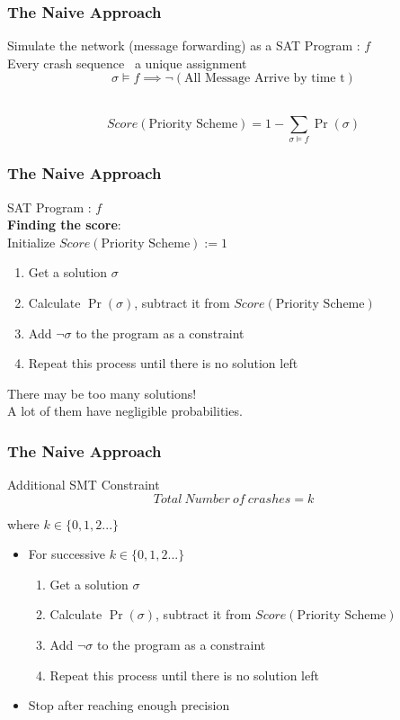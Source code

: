 \documentclass{beamer}
\begin{document}
\begin{frame}
\frametitle{The Naive Approach}
	Simulate the network (message forwarding) as a SAT Program : $ f $ \\[3ex]
	Every crash sequence \mapsto\ a unique assignment \sigma\  
	\vspace*{-5pt}
	$$ \sigma \vDash f \implies \neg(\text{All Message Arrive by time t}) $$
	\begin{block}{$\ $}
	$$ Score(\text{Priority Scheme}) = 1-\sum_{\sigma \vDash f}\Pr(\sigma) $$
	\end{block}
\end{frame}

\begin{frame}
\frametitle{The Naive Approach}
	
	SAT Program : $ f $ \\[3ex]
	\textbf{Finding the score}:\\
	Initialize $Score(\text{Priority Scheme}):=1$

	\begin{enumerate}
		\item Get a solution $\sigma$
		\item Calculate $\Pr(\sigma)$, subtract it from $Score(\text{Priority Scheme})$
		\item Add $\neg \sigma$ to the program as a constraint
		\item Repeat this process until there is no solution left\\[3ex]
	\end{enumerate}
	\pause
	\color{red}
	There may be too many solutions!\\
	A lot of them have negligible probabilities.\\
\end{frame}

\begin{frame}
\frametitle{The Naive Approach}
	\begin{block}{Additional SMT Constraint}
	\begin{equation}
		Total\ Number\ of\ crashes = k
	\end{equation} 
	\begin{flushright}
		where $k\in\{0,1,2...\}$
	\end{flushright}
	\end{block}
	\pause
	\begin{itemize}
	\item For successive $k\in\{0,1,2...\}$
	\begin{enumerate}
		\item Get a solution $\sigma$
		\item Calculate $\Pr(\sigma)$, subtract it from $Score(\text{Priority Scheme})$
		\item Add $\neg \sigma$ to the program as a constraint
		\item Repeat this process until there is no solution left
	\end{enumerate}
	\item Stop after reaching enough precision
	\end{itemize}
\end{frame}
\end{document}
